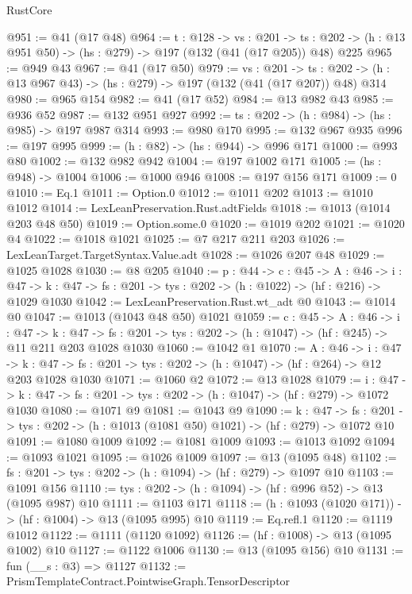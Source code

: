 \begin{lexlean}{RustCore}
\begin{coremodule}
@951 := @41 (@17 @48)
@964 := {t : @128} ->
  {vs : @201} ->
  {ts : @202} -> (h : @13 @951 @50) -> (hs : @279) -> @197 (@132 (@41 (@17 @205)) @48) @225
@965 := @949 @43
@967 := @41 (@17 @50)
@979 := {vs : @201} ->
  {ts : @202} -> (h : @13 @967 @43) -> (hs : @279) -> @197 (@132 (@41 (@17 @207)) @48) @314
@980 := @965 @154
@982 := @41 (@17 @52)
@984 := @13 @982 @43
@985 := @936 @52
@987 := @132 @951 @927
@992 := {ts : @202} -> (h : @984) -> (hs : @985) -> @197 @987 @314
@993 := @980 @170
@995 := @132 @967 @935
@996 := @197 @995
@999 := (h : @82) -> (hs : @944) -> @996 @171
@1000 := @993 @80
@1002 := @132 @982 @942
@1004 := @197 @1002 @171
@1005 := (hs : @948) -> @1004
@1006 := @1000 @946
@1008 := @197 @156 @171
@1009 := 0
@1010 := Eq.{1}
@1011 := Option.{0}
@1012 := @1011 @202
@1013 := @1010 @1012
@1014 := LexLeanPreservation.Rust.adtFields
@1018 := @1013 (@1014 @203 @48 @50)
@1019 := Option.some.{0}
@1020 := @1019 @202
@1021 := @1020 @4
@1022 := @1018 @1021
@1025 := @7 @217 @211 @203
@1026 := LexLeanTarget.TargetSyntax.Value.adt
@1028 := @1026 @207 @48
@1029 := @1025 @1028
@1030 := @8 @205
@1040 := {p : @44} ->
  {c : @45} ->
  {A : @46} ->
  {i : @47} -> {k : @47} -> {fs : @201} -> {tys : @202} -> (h : @1022) -> (hf : @216) -> @1029 @1030
@1042 := LexLeanPreservation.Rust.wt_adt @0
@1043 := @1014 @0
@1047 := @1013 (@1043 @48 @50) @1021
@1059 := {c : @45} ->
  {A : @46} ->
  {i : @47} ->
  {k : @47} ->
  {fs : @201} -> {tys : @202} -> (h : @1047) -> (hf : @245) -> @11 @211 @203 @1028 @1030
@1060 := @1042 @1
@1070 := {A : @46} ->
  {i : @47} ->
  {k : @47} -> {fs : @201} -> {tys : @202} -> (h : @1047) -> (hf : @264) -> @12 @203 @1028 @1030
@1071 := @1060 @2
@1072 := @13 @1028
@1079 := {i : @47} ->
  {k : @47} -> {fs : @201} -> {tys : @202} -> (h : @1047) -> (hf : @279) -> @1072 @1030
@1080 := @1071 @9
@1081 := @1043 @9
@1090 := {k : @47} ->
  {fs : @201} -> {tys : @202} -> (h : @1013 (@1081 @50) @1021) -> (hf : @279) -> @1072 @10
@1091 := @1080 @1009
@1092 := @1081 @1009
@1093 := @1013 @1092
@1094 := @1093 @1021
@1095 := @1026 @1009
@1097 := @13 (@1095 @48)
@1102 := {fs : @201} -> {tys : @202} -> (h : @1094) -> (hf : @279) -> @1097 @10
@1103 := @1091 @156
@1110 := {tys : @202} -> (h : @1094) -> (hf : @996 @52) -> @13 (@1095 @987) @10
@1111 := @1103 @171
@1118 := (h : @1093 (@1020 @171)) -> (hf : @1004) -> @13 (@1095 @995) @10
@1119 := Eq.refl.{1}
@1120 := @1119 @1012
@1122 := @1111 (@1120 @1092)
@1126 := (hf : @1008) -> @13 (@1095 @1002) @10
@1127 := @1122 @1006
@1130 := @13 (@1095 @156) @10
@1131 := fun (__s : @3) => @1127
@1132 := PrismTemplateContract.PointwiseGraph.TensorDescriptor

\end{coremodule}
\end{lexlean}
